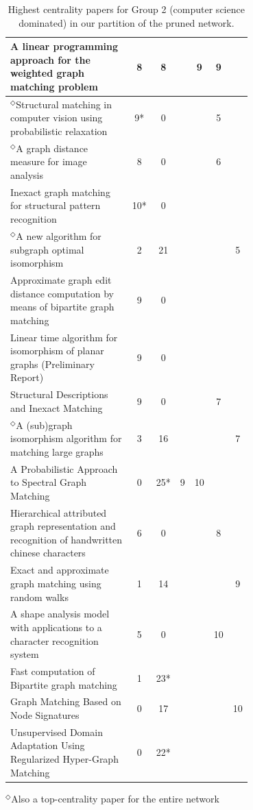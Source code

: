 \documentclass[12pt]{thesis}
\theoremstyle{plain}
\theoremstyle{definition}
\theoremstyle{remark}
\begin{document}
\begin{table}[H]
{\begin{tabular}{|L{0.7\linewidth}|c|c|c|c|c|c|}
A linear programming approach for the weighted graph matching problem  \cite{Almohamad_1993} & 8 & 8 &  & 9 & 9 &  \\ \hline
$^\Diamond$Structural matching in computer vision using probabilistic relaxation  \cite{Christmas_1995} & 9* & 0 &  &  & 5 &  \\ \hline
$^\Diamond$A graph distance measure for image analysis  \cite{Eshera_1984} & 8 & 0 &  &  & 6 &  \\ \hline
Inexact graph matching for structural pattern recognition  \cite{Bunke_1983} & 10* & 0 &  &  &  &  \\ \hline
$^\Diamond$A new algorithm for subgraph optimal isomorphism  \cite{El_Sonbaty_1998} & 2 & 21 &  &  &  & 5 \\ \hline
Approximate graph edit distance computation by means of bipartite graph matching  \cite{Riesen_2009} & 9 & 0 &  &  &  &  \\ \hline
Linear time algorithm for isomorphism of planar graphs (Preliminary Report)  \cite{Hopcroft_1974} & 9 & 0 &  &  &  &  \\ \hline
Structural Descriptions and Inexact Matching  \cite{Shapiro_1981} & 9 & 0 &  &  & 7 &  \\ \hline
$^\Diamond$A (sub)graph isomorphism algorithm for matching large graphs  \cite{Cordella_2004} & 3 & 16 &  &  &  & 7 \\ \hline
A Probabilistic Approach to Spectral Graph Matching  \cite{Egozi_2013} & 0 & 25* & 9 & 10 &  &  \\ \hline
Hierarchical attributed graph representation and recognition of handwritten chinese characters  \cite{Lu_1991} & 6 & 0 &  &  & 8 &  \\ \hline
Exact and approximate graph matching using random walks  \cite{Gori_2005} & 1 & 14 &  &  &  & 9 \\ \hline
A shape analysis model with applications to a character recognition system  \cite{Rocha_1994} & 5 & 0 &  &  & 10 &  \\ \hline
Fast computation of Bipartite graph matching  \cite{Serratosa_2014} & 1 & 23* &  &  &  &  \\ \hline
Graph Matching Based on Node Signatures  \cite{Jouili_2009} & 0 & 17 &  &  &  & 10 \\ \hline
Unsupervised Domain Adaptation Using Regularized Hyper-Graph Matching  \cite{Das_2018} & 0 & 22* &  &  &  &  \\ \hline
\end{tabular}

\vspace{-.03cm}
$^\Diamond$Also a top-centrality paper for the entire network}
\caption{Highest centrality papers for Group 2 (computer science dominated) in our partition of the pruned network.}
\label{tab:toppapers_CS}
\end{table}
\end{document}
